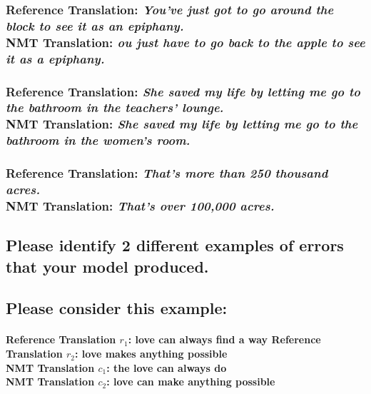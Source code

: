 \documentclass[12pt, letterpaper]{article}
\begin{document}
\subsubsection{\textbf{Reference Translation}: \textit{You’ve just got to go around the block to see it as an epiphany.} \\ \textbf{NMT Translation}: \textit{ou just have to go back to the apple to see it as a epiphany.}}

\subsubsection{\textbf{Reference Translation}: \textit{She saved my life by letting me go to the bathroom in the teachers’ lounge.} \\ \textbf{NMT Translation}: \textit{She saved my life by letting me go to the bathroom in the women’s room.}}

\subsubsection{\textbf{Reference Translation}: \textit{That’s more than 250 thousand acres.} \\ \textbf{NMT Translation}: \textit{That’s over 100,000 acres.}}

\subsection{Please identify 2 different examples of errors that your model produced.}

\subsection{Please consider this example:}

\paragraph{Reference Translation $r_1$: love can always find a way Reference \\ Translation $r_2$: love makes anything possible \\
NMT Translation $c_1$: the love can always do \\
NMT Translation $c_2$: love can make anything possible}
\end{document}
